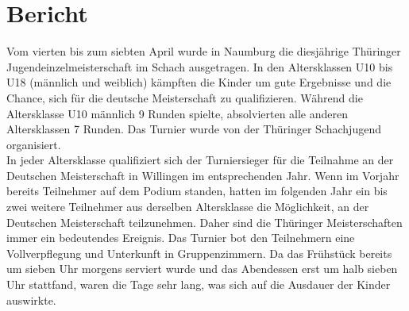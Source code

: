 \documentclass[a4paper,ngerman]{tui-algo-seminar}
\title{\inhalt}
\author{Erik Skopp}
\newcommand{\inhalt}{Thüringer Jugend Einzelmeisterschaft 2024}
\begin{document}
\maketitle
\thispagestyle{plain}
\begin{abstract}
    Bericht: \inhalt.\\
    Vom 4. bis zum 7. April fand in Naumburg (Sachsen-Anhalt) die diesjährige Thüringer Jugend-Einzelmeisterschaft im Schach statt. In jeder Altersklasse wurden sieben Runden nach dem Schweizer System ausgetragen. Die Gewinner qualifizieren sich für die Deutsche Einzelmeisterschaft in Willingen.
\end{abstract}

\tableofcontents 

\clearpage

\section{Bericht}

Vom vierten bis zum siebten April wurde in Naumburg die diesjährige Thüringer Jugendeinzelmeisterschaft im Schach ausgetragen. In den Altersklassen U10 bis U18 (männlich und weiblich) kämpften die Kinder um gute Ergebnisse und die Chance, sich für die deutsche Meisterschaft zu qualifizieren. Während die Altersklasse U10 männlich 9 Runden spielte, absolvierten alle anderen Altersklassen 7 Runden. Das Turnier wurde von der Thüringer Schachjugend organisiert.\\

In jeder Altersklasse qualifiziert sich der Turniersieger für die Teilnahme an der Deutschen Meisterschaft in Willingen im entsprechenden Jahr. Wenn im Vorjahr bereits Teilnehmer auf dem Podium standen, hatten im folgenden Jahr ein bis zwei weitere Teilnehmer aus derselben Altersklasse die Möglichkeit, an der Deutschen Meisterschaft teilzunehmen. Daher sind die Thüringer Meisterschaften immer ein bedeutendes Ereignis. Das Turnier bot den Teilnehmern eine Vollverpflegung und Unterkunft in Gruppenzimmern. Da das Frühstück bereits um sieben Uhr morgens serviert wurde und das Abendessen erst um halb sieben Uhr stattfand, waren die Tage sehr lang, was sich auf die Ausdauer der Kinder auswirkte.\\
\end{document}
